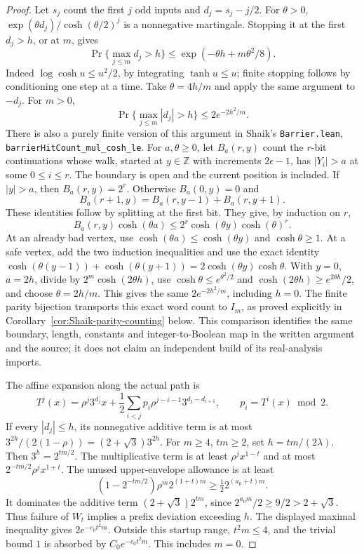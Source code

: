 \begin{proof}
Let \(s_j\) count the first \(j\) odd inputs and \(d_j=s_j-j/2\).
For \(\theta>0\),
\(\exp(\theta d_j)/\cosh(\theta/2)^j\) is a nonnegative martingale.
Stopping it at the first \(d_j>h\), or at \(m\), gives
\[
 \Pr\{\max_{j\le m}d_j>h\}
 \le \exp(-\theta h+m\theta^2/8).
\]
Indeed \(\log\cosh u\le u^2/2\), by integrating
\(\tanh u\le u\); finite stopping follows by conditioning one step at
a time. Take \(\theta=4h/m\) and apply the same argument to \(-d_j\).
For \(m>0\),
\[
 \Pr\{\max_{j\le m}|d_j|>h\}\le2e^{-2h^2/m}.
\]
There is also a purely finite version of this argument in Shaik's
\texttt{Barrier.lean}, \texttt{barrierHitCount\_mul\_cosh\_le}.
For \(a,\theta\ge0\), let \(B_a(r,y)\) count the \(r\)-bit continuations
whose walk, started at \(y\in\mathbb Z\) with increments \(2\epsilon-1\),
has \(|Y_i|>a\) at some \(0\le i\le r\). The boundary is open and the
current position is included. If \(|y|>a\), then \(B_a(r,y)=2^r\).
Otherwise \(B_a(0,y)=0\) and
\[
 B_a(r+1,y)=B_a(r,y-1)+B_a(r,y+1).
\]
These identities follow by splitting at the first bit. They give,
by induction on \(r\),
\[
 B_a(r,y)\cosh(\theta a)
 \le 2^r\cosh(\theta y)\cosh(\theta)^r .
\]
At an already bad vertex, use
\(\cosh(\theta a)\le\cosh(\theta y)\) and \(\cosh\theta\ge1\).
At a safe vertex, add the two induction inequalities and use the
exact identity
\(\cosh(\theta(y-1))+\cosh(\theta(y+1))
=2\cosh(\theta y)\cosh\theta\).
With \(y=0\), \(a=2h\), divide by \(2^m\cosh(2\theta h)\), use
\(\cosh\theta\le e^{\theta^2/2}\) and
\(\cosh(2\theta h)\ge e^{2\theta h}/2\), and choose
\(\theta=2h/m\). This gives the same
\(2e^{-2h^2/m}\), including \(h=0\). The finite parity bijection
transports this exact word count to \(I_m\), as proved explicitly
in Corollary~\ref{cor:Shaik-parity-counting} below. This comparison
identifies the same boundary, length, constants and integer-to-Boolean
map in the written argument and the source; it does not claim an
independent build of its real-analysis imports.

The affine expansion along the actual path is
\[
 T^j(x)=\rho^j3^{d_j}x+
 \frac12\sum_{i<j}p_i\rho^{j-i-1}3^{d_j-d_{i+1}},
 \qquad p_i=T^i(x)\bmod2 .
\]
If every \(|d_j|\le h\), its nonnegative additive term is at most
\(3^{2h}/(2(1-\rho))=(2+\sqrt3)3^{2h}\).
For \(m\ge4\), \(tm\ge2\), set \(h=tm/(2\lambda)\).
Then \(3^h=2^{tm/2}\). The multiplicative term is at least
\(\rho^jx^{1-t}\) and at most \(2^{-tm/2}\rho^jx^{1+t}\).
The unused upper-envelope allowance is at least
\[
 (1-2^{-tm/2})\rho^m2^{(1+t)m}
 \ge \tfrac12 2^{(a_0+t)m}.
\]
It dominates the additive term \((2+\sqrt3)2^{tm}\), since
\(2^{a_0m}/2\ge9/2>2+\sqrt3\).
Thus failure of \(W_t\) implies a prefix deviation exceeding \(h\).
The displayed maximal inequality gives \(2e^{-c_0t^2m}\).
Outside this startup range, \(t^2m\le4\), and the trivial bound \(1\)
is absorbed by \(C_0e^{-c_0t^2m}\). This includes \(m=0\).
\end{proof}


